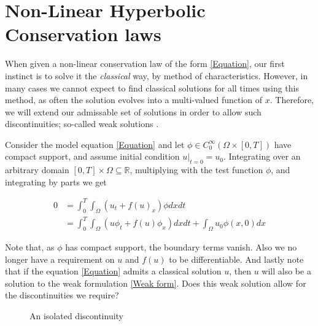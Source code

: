 \documentclass{article}
\numberwithin{equation}{section}
\begin{document}
\section{Non-Linear Hyperbolic Conservation laws}
When given a non-linear conservation law of the form \ref{Equation}, our first instinct is to solve it the \textit{classical} way, by method of characteristics. However, in many cases we cannot expect to find classical solutions for all times using this method, as often the solution evolves into a multi-valued function of $x$.
Therefore, we will extend our admissable set of solutions in order to allow such discontinuities; so-called weak solutions \cite{HoldenH.Helge2015Ftfh}. 

Consider the model equation \ref{Equation} and let $\phi \in C_0^{\infty}(\Omega \times [0, T])$ have compact support, and assume initial condition $u|_{t=0} = u_0 $. Integrating over an arbitrary domain $[0,T] \times \Omega \subseteq \mathbb{R}$, multiplying with the test function $\phi$, and integrating by parts we get

\begin{align}
    0 &= \int_0^T \int_{\Omega} (u_t + f(u)_x)\phi dxdt \\
      &= \int_0^T \int_{\Omega} (u \phi_t + f(u)\phi_x) dxdt + \int_{\Omega} u_0 \phi(x,0) dx 
    \label{Weak form}
\end{align}

Note that, as $\phi$ has compact support, the boundary terms vanish. Also we no longer have a requirement on $u$ and $f(u)$ to be differentiable. And lastly note that if the equation \ref{Equation} admits a classical solution $u$, then $u$ will also be a solution to the weak formulation \ref{Weak form}. Does this weak solution allow for the discontinuities we require?
\begin{figure}
    \begin{center}
        \label{fig:ConservationLaws/Isolated_disc}
        \caption{An isolated discontinuity}
    \end{center}

\end{figure}{}
\end{document}
